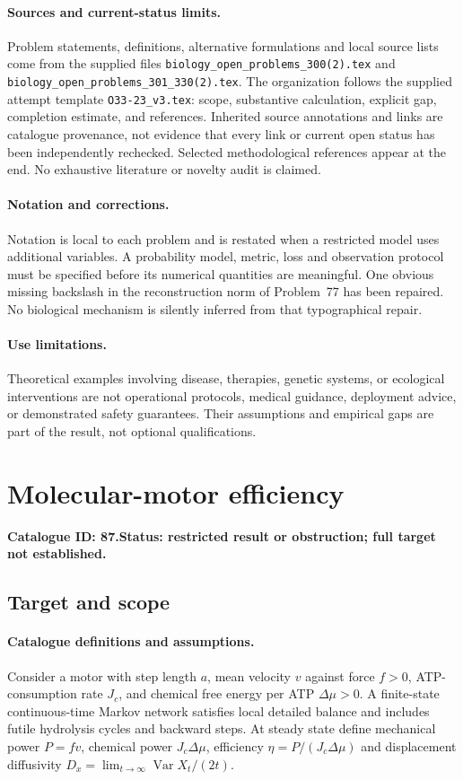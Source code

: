 \documentclass[11pt]{article}
\DeclareMathOperator{\Var}{Var}
\providecommand{\Var}{\operatorname{Var}}
\begin{document}
\paragraph{Sources and current-status limits.}
Problem statements, definitions, alternative formulations and local source lists
come from the supplied files
\texttt{biology\_open\_problems\_300(2).tex} and
\texttt{biology\_open\_problems\_301\_330(2).tex}.
The organization follows the supplied attempt template
\texttt{O33-23\_v3.tex}: scope, substantive calculation, explicit gap,
completion estimate, and references. Inherited source annotations and links are
catalogue provenance, not evidence that every link or current open status has
been independently rechecked. Selected methodological references appear at the
end. No exhaustive literature or novelty audit is claimed.

\paragraph{Notation and corrections.}
Notation is local to each problem and is restated when a restricted model uses
additional variables. A probability model, metric, loss and observation protocol
must be specified before its numerical quantities are meaningful. One obvious
missing backslash in the reconstruction norm of Problem~77 has been repaired.
No biological mechanism is silently inferred from that typographical repair.

\paragraph{Use limitations.}
Theoretical examples involving disease, therapies, genetic systems, or ecological
interventions are not operational protocols, medical guidance, deployment advice,
or demonstrated safety guarantees. Their assumptions and empirical gaps are part
of the result, not optional qualifications.

\setcounter{section}{86}
\section{Molecular-motor efficiency}
\label{prob:087}
\noindent\textbf{Catalogue ID: 87.}\quad \textbf{Status: restricted result or obstruction; full target not established.}
\subsection{Target and scope}
\paragraph{Catalogue definitions and assumptions.}
Consider a motor with step length $a$, mean velocity $v$ against force $f>0$, ATP-consumption rate $J_c$, and chemical free energy per ATP $\Delta\mu>0$. A finite-state continuous-time Markov network satisfies local detailed balance and includes futile hydrolysis cycles and backward steps. At steady state define mechanical power $P=fv$, chemical power $J_c\Delta\mu$, efficiency $\eta=P/(J_c\Delta\mu)$ and displacement diffusivity $D_x=\lim_{t\to\infty}\Var X_t/(2t)$.
\end{document}
